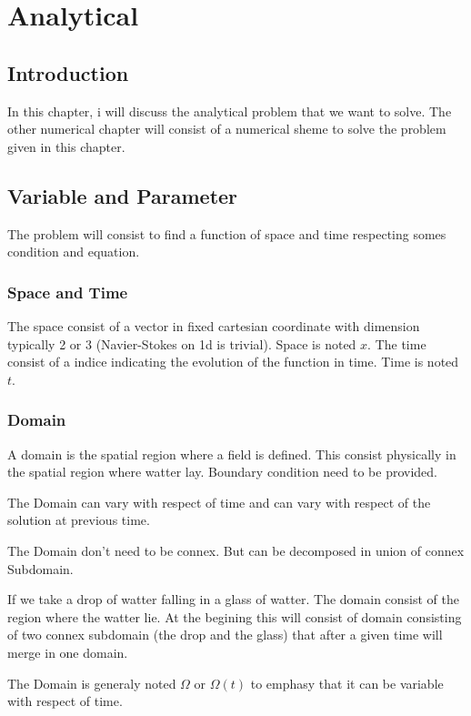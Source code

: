 \chapter{Analytical}
\section{Introduction}
In this chapter, i will discuss the analytical problem that we want to solve.
The other numerical chapter will consist of a numerical sheme to solve the problem given in this chapter.

\section{Variable and Parameter}

The problem will consist to find a function of space and time respecting somes condition and equation.

\subsection{Space and Time}

The space consist of a vector in fixed cartesian coordinate with dimension typically 2 or 3 (Navier-Stokes on 1d is trivial).
Space is noted $x$.
The time consist of a indice indicating the evolution of the function in time.
Time is noted $t$.

\subsection{Domain}

A domain is the spatial region where a field is defined. This consist physically in the spatial region where watter lay.
Boundary condition need to be provided.

The Domain can vary with respect of time and can vary with respect of the solution at previous time.

The Domain don't need to be connex. But can be decomposed in union of connex Subdomain.

\begin{example}
 If we take a drop of watter falling in a glass of watter. The domain consist of the region where the watter lie.
 At the begining this will consist of domain consisting of two connex subdomain (the drop and the glass)
 that after a given time will merge in one domain.
\end{example}

The Domain is generaly noted $\Omega$ or $\Omega(t)$ to emphasy that it can be variable with respect of time.

